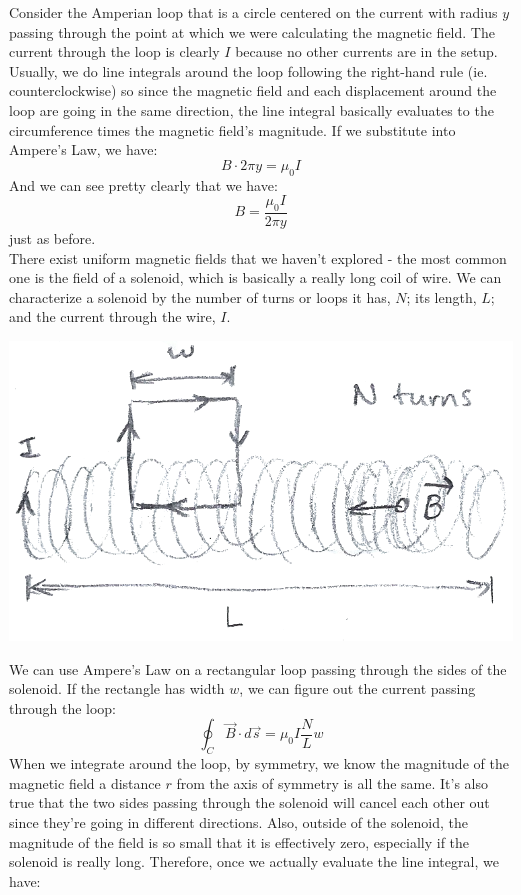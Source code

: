 Consider the Amperian loop that is a circle centered on the current with radius $y$ passing through the point at which we were calculating the magnetic field. The current through the loop is clearly $I$ because no other currents are in the setup. Usually, we do line integrals around the loop following the right-hand rule (ie. counterclockwise) so since the magnetic field and each displacement around the loop are going in the same direction, the line integral basically evaluates to the circumference times the magnetic field's magnitude. If we substitute into Ampere's Law, we have:
\[
	B \cdot 2\pi y = \mu_0 I
\]
And we can see pretty clearly that we have: 
\[
	B = \frac{\mu_0I}{2\pi y}
\]
just as before. \\
There exist uniform magnetic fields that we haven't explored - the most common one is the field of a solenoid, which is basically a really long coil of wire. We can characterize a solenoid by the number of turns or loops it has, $N$; its length, $L$; and the current through the wire, $I$. 
\begin{center}
	\includegraphics[scale=0.25]{images/em/solenoid.png}
\end{center}
We can use Ampere's Law on a rectangular loop passing through the sides of the solenoid. If the rectangle has width $w$, we can figure out the current passing through the loop:
\[
	\oint_C \vec B \cdot d\vec s = \mu_0 I \frac{N}{L} w
\]
When we integrate around the loop, by symmetry, we know the magnitude of the magnetic field a distance $r$ from the axis of symmetry is all the same. It's also true that the two sides passing through the solenoid will cancel each other out since they're going in different directions. Also, outside of the solenoid, the magnitude of the field is so small that it is effectively zero, especially if the solenoid is really long. Therefore, once we actually evaluate the line integral, we have:
